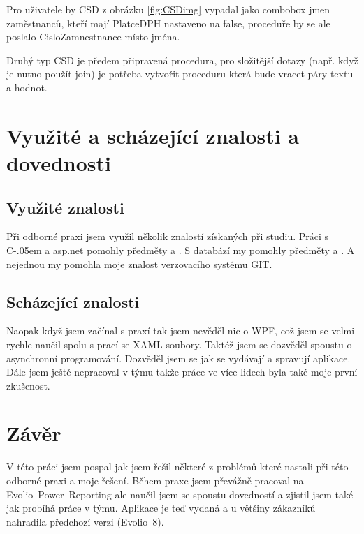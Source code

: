 \documentclass[czech,bachelorpractice,dept460,male,csharp]{diploma}
\newcommand{\EvolioEight}{Evolio~8}
\newcommand{\EFilters}{Evolio~Power~Reporting}
\newcommand{\Csharp}{%
  {\settoheight{\dimen0}{C}C\kern-.05em \resizebox{!}{\dimen0}{\raisebox{\depth}{\#}}}}
\begin{document}
			Pro uživatele by CSD z obrázku \ref{fig:CSDimg} vypadal jako combobox jmen zaměstnanců, kteří mají PlatceDPH nastaveno na false, proceduře by se ale poslalo CisloZamnestnance místo jména.
			
			Druhý typ CSD je předem připravená procedura, pro složitější dotazy (např. když je nutno použít join) je potřeba vytvořit proceduru která bude vracet páry textu a hodnot.
			
\section{Využité a scházející znalosti a dovednosti}
	\subsection{Využité znalosti}
		Při odborné praxi jsem využil několik znalostí získaných při studiu. Práci s {\Csharp} a asp.net pomohly předměty  a . S databází my pomohly předměty  a . A nejednou my pomohla moje znalost verzovacího systému GIT.
	\subsection{Scházející znalosti}
		Naopak když jsem začínal s praxí tak jsem nevěděl nic o WPF, což jsem se velmi rychle naučil spolu s prací se XAML soubory. Taktéž jsem se dozvěděl spoustu o asynchronní programování. Dozvěděl jsem se jak se vydávají a spravují aplikace. Dále jsem ještě nepracoval v týmu takže práce ve více lidech byla také moje první zkušenost.
		
\section{Závěr}
V této práci jsem pospal jak jsem řešil některé z problémů které nastali při této odborné praxi a moje řešení. Během praxe jsem převážně pracoval na {\EFilters} ale naučil jsem se spoustu dovedností a zjistil jsem také jak probíhá práce v týmu. Aplikace je teď vydaná a u většiny zákazníků nahradila předchozí verzi ({\EvolioEight}). 

\printbibliography[title={Literatura}, heading=bibintoc]


\end{document}
